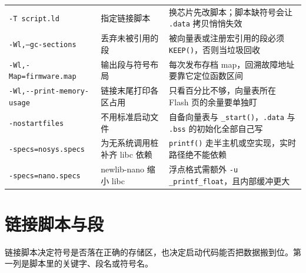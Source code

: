 \documentclass[12pt,a4paper,fontset=fandol]{ctexbook}
\newcommand{\Fn}[1]{\texttt{#1()}}
\newcommand{\Tp}[1]{\texttt{#1}}
\newcommand{\Bk}{\discretionary{}{}{}}
\begin{document}
\begin{longtable}{>{\raggedright\arraybackslash\footnotesize}p{} >{\raggedright\arraybackslash\footnotesize}p{} >{\raggedright\arraybackslash\footnotesize}p{}}
\Tp{-T script.ld} & 指定链接脚本 & 换芯片先改脚本；脚本缺符号会让 \Tp{.data} 拷贝悄悄失效 \\
\Tp{-Wl,--gc-sections} & 丢弃未被引用的段 & 被向量表或注册宏引用的段必须 \Tp{KEEP()}，否则当垃圾回收 \\
\Tp{-Wl,-Map=firmware.map} & 输出段与符号布局 & 每次发布存档 map，回溯故障地址要靠它定位函数区间 \\
\Tp{-{\Bk}Wl,-{\Bk}-{\Bk}print-{\Bk}memory-{\Bk}usage} & 链接末尾打印各区占用 & 只看百分比不够，向量表所在 Flash 页的余量要单独盯 \\
\Tp{-nostartfiles} & 不用标准启动文件 & 自备向量表与 \Fn{\_start}，\Tp{.data} 与 \Tp{.bss} 的初始化全部自己写 \\
\Tp{-specs=nosys.specs} & 为无系统调用桩补齐 libc 依赖 & \Fn{printf} 走半主机或空实现，实时路径绝不能依赖 \\
\Tp{-specs=nano.specs} & newlib-nano 缩小 libc & 浮点格式需额外 \Tp{-u \_printf\_float}，且内部缓冲更大 \\
\end{longtable}

\section{链接脚本与段}

链接脚本决定符号是否落在正确的存储区，也决定启动代码能否把数据搬到位。第一列是脚本里的关键字、段名或符号名。
\end{document}
